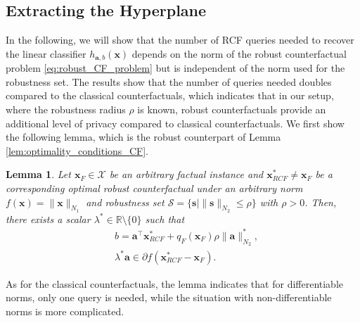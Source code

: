 \documentclass{article}
\newtheorem{lemma}[theorem]{Lemma}
\begin{document}
\subsection{Extracting the Hyperplane}
In the following, we will show that the number of RCF queries needed to recover the linear classifier $h_{\bm{a},b}(\bm{x})$ depends on the norm of the robust counterfactual problem \eqref{eq:robust_CF_problem} but is independent of the norm used for the robustness set. The results show that the number of queries needed doubles compared to the classical counterfactuals, which indicates that in our setup, where the robustness radius $\rho$ is known, robust counterfactuals provide an additional level of privacy compared to classical counterfactuals. We first show the following lemma, which is the robust counterpart of Lemma \ref{lem:optimality_conditions_CF}.

\begin{lemma}\label{lem:optimality_conditions_RCF}
Let $\bm{x}_F\in \mathcal X$ be an arbitrary factual instance and $\bm{x}_{RCF}^*\neq \bm{x}_F$ be a corresponding optimal robust counterfactual under an arbitrary norm $f(\bm{x})=\| \bm{x} \|_{N_1}$ and robustness set $\mathcal S=\{ \bm{s}\mid \|\bm{s}\|_{N_2}\le \rho\}$ with $\rho > 0$. Then, there exists a scalar $\lambda^*\in \mathbb R\setminus \{0\}$ such that
\begin{align*}
    & b = \bm{a}^\top \bm{x}^*_{RCF} +q_F(\bm{x}_F) \rho\|\bm{a}\|_{N_2}^*,  \\
    & \lambda^* \bm{a} \in \partial  f(\bm{x}^*_{RCF} - \bm{x}_F) .
\end{align*}
\end{lemma}

As for the classical counterfactuals, the lemma indicates that for differentiable norms, only one query is needed, while the situation with non-differentiable norms is more complicated.
\end{document}
